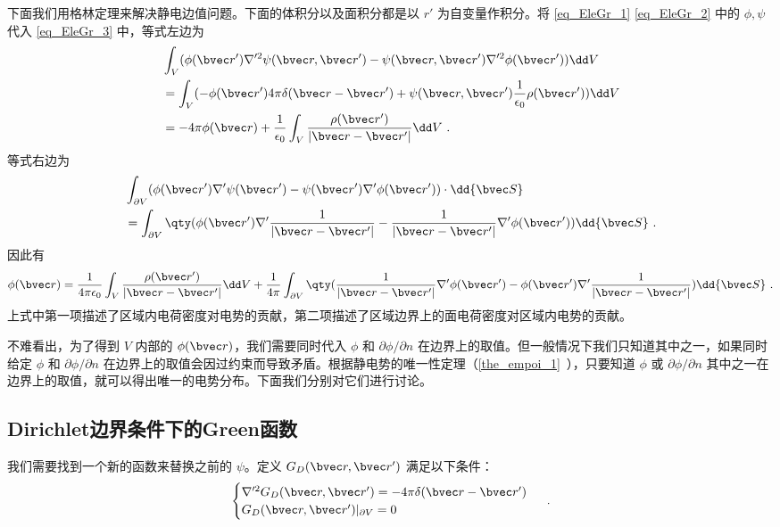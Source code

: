 下面我们用格林定理来解决静电边值问题。下面的体积分以及面积分都是以 $r'$ 为自变量作积分。将 \autoref{eq_EleGr_1} \autoref{eq_EleGr_2} 中的 $\phi,\psi$ 代入 \autoref{eq_EleGr_3}  中，等式左边为
\begin{equation}
\begin{aligned}
&\int_V(\phi(\bvec r')\nabla'^2\psi(\bvec r,\bvec r')-\psi(\bvec r,\bvec r')\nabla'^2\phi(\bvec r'))\dd V
\\
&=\int_V(-\phi(\bvec r')4\pi \delta(\bvec r-\bvec r')+\psi(\bvec r,\bvec r')\frac{1}{\epsilon_0}\rho(\bvec r'))\dd V\\
&=-4\pi\phi(\bvec r)+\frac{1}{\epsilon_0}\int_V\frac{\rho(\bvec r')}{|\bvec r-\bvec r'|}\dd V~.
\end{aligned}
\end{equation}
等式右边为
\begin{equation}
\begin{aligned}
&\int_{\partial V}(\phi(\bvec r')\nabla'\psi(\bvec r')-\psi(\bvec r')\nabla'\phi(\bvec r'))\cdot \dd {\bvec S}\\
&=\int_{\partial V}\qty(\phi(\bvec r')\nabla'\frac{1}{|\bvec r-\bvec r'|}-\frac{1}{|\bvec r-\bvec r'|}\nabla'\phi(\bvec r'))\dd {\bvec S}~.
\end{aligned}
\end{equation}
因此有
\begin{equation}
\phi(\bvec r)=\frac{1}{4\pi\epsilon_0}\int_V\frac{\rho(\bvec r')}{|\bvec r-\bvec r'|}\dd V+\frac{1}{4\pi}\int_{\partial V}\qty(\frac{1}{|\bvec r-\bvec r'|}\nabla'\phi(\bvec r')-\phi(\bvec r')\nabla'\frac{1}{|\bvec r-\bvec r'|})\dd {\bvec S}~.
\end{equation}
上式中第一项描述了区域内电荷密度对电势的贡献，第二项描述了区域边界上的面电荷密度对区域内电势的贡献。

不难看出，为了得到 $V$ 内部的 $\phi(\bvec r)$，我们需要同时代入 $\phi$ 和 $\partial \phi/\partial n$ 在边界上的取值。但一般情况下我们只知道其中之一，如果同时给定 $\phi$ 和 $\partial \phi/\partial n$ 在边界上的取值会因过约束而导致矛盾。根据静电势的唯一性定理（\autoref{the_empoi_1}~），只要知道 $\phi$ 或 $\partial \phi/\partial n$ 其中之一在边界上的取值，就可以得出唯一的电势分布。下面我们分别对它们进行讨论。

\subsection{Dirichlet边界条件下的Green函数}

我们需要找到一个新的函数来替换之前的 $\psi$。定义 $G_D(\bvec r,\bvec r')$ 满足以下条件：
\begin{equation}\label{eq_EleGr_6}
\begin{cases}
\nabla'^2G_D(\bvec r,\bvec r')=-4\pi\delta(\bvec r-\bvec r')\\
G_D(\bvec r,\bvec r')|_{\partial V}=0
\end{cases}~.
\end{equation}

